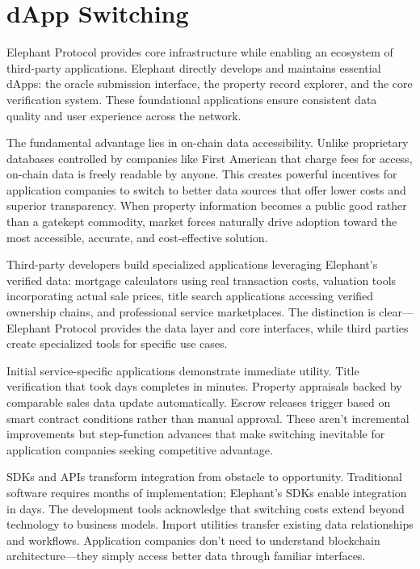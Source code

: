 \section{dApp Switching}

Elephant Protocol provides core infrastructure while enabling an ecosystem of third-party applications. Elephant directly develops and maintains essential dApps: the oracle submission interface, the property record explorer, and the core verification system. These foundational applications ensure consistent data quality and user experience across the network.

The fundamental advantage lies in on-chain data accessibility. Unlike proprietary databases controlled by companies like First American that charge fees for access, on-chain data is freely readable by anyone. This creates powerful incentives for application companies to switch to better data sources that offer lower costs and superior transparency. When property information becomes a public good rather than a gatekept commodity, market forces naturally drive adoption toward the most accessible, accurate, and cost-effective solution.

Third-party developers build specialized applications leveraging Elephant's verified data: mortgage calculators using real transaction costs, valuation tools incorporating actual sale prices, title search applications accessing verified ownership chains, and professional service marketplaces. The distinction is clear---Elephant Protocol provides the data layer and core interfaces, while third parties create specialized tools for specific use cases.

Initial service-specific applications demonstrate immediate utility. Title verification that took days completes in minutes. Property appraisals backed by comparable sales data update automatically. Escrow releases trigger based on smart contract conditions rather than manual approval. These aren't incremental improvements but step-function advances that make switching inevitable for application companies seeking competitive advantage.

SDKs and APIs transform integration from obstacle to opportunity. Traditional software requires months of implementation; Elephant's SDKs enable integration in days. The development tools acknowledge that switching costs extend beyond technology to business models. Import utilities transfer existing data relationships and workflows. Application companies don't need to understand blockchain architecture---they simply access better data through familiar interfaces.

